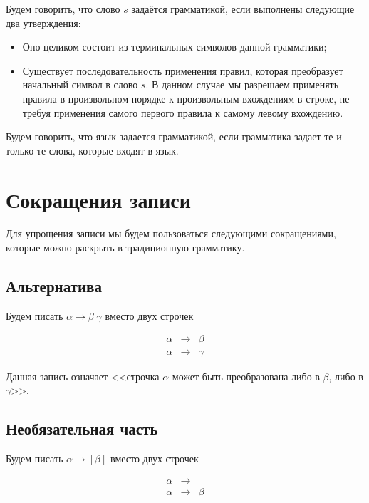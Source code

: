 \documentclass[12pt,a4paper,oneside]{article}
\begin{document}
\begin{definition}
Будем говорить, что слово $s$ задаётся грамматикой, если выполнены следующие два утверждения:
\begin{itemize}
\item Оно целиком состоит из терминальных символов данной грамматики;
\item Существует последовательность применения правил, которая преобразует
начальный символ в слово $s$. В данном случае мы разрешаем применять правила
в произвольном порядке к произвольным вхождениям в строке, не требуя применения 
самого первого правила к самому левому вхождению.
\end{itemize}
\end{definition}

\begin{definition}
Будем говорить, что язык задается грамматикой, если грамматика задает те и только
те слова, которые входят в язык.
\end{definition}

\section{Сокращения записи}

Для упрощения записи мы будем пользоваться следующими сокращениями, которые 
можно раскрыть в традиционную грамматику.

\subsection{Альтернатива}

Будем писать $\alpha \rightarrow \beta | \gamma$ вместо двух строчек
\begin{bnf}\begin{eqnarray*}
\alpha &\rightarrow&\beta\\
\alpha &\rightarrow&\gamma
\end{eqnarray*}\end{bnf}
\vspace{-0.3cm}

Данная запись означает <<строчка $\alpha$ может быть преобразована либо в $\beta$,
либо в $\gamma$>>.

\subsection{Необязательная часть}

Будем писать $\alpha \rightarrow [\beta]$ вместо двух строчек
\begin{bnf}\begin{eqnarray*}
\alpha &\rightarrow&\\
\alpha &\rightarrow&\beta
\end{eqnarray*}\end{bnf}
\vspace{-0.7cm}
\end{document}
